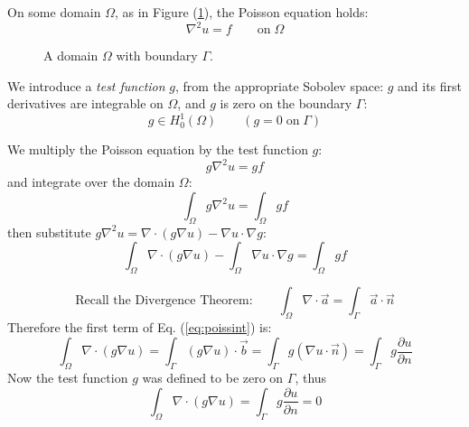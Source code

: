 \documentclass[12pt, a4paper, twoside, openright]{book}
\begin{document}
\vspace{2em}

On some domain $\Omega$, as in Figure (\ref{domain}), the Poisson equation holds:
\begin{equation}
\nabla^2 u = f \qquad \text{on} \; \Omega
\end{equation}

\vspace{1em}
\begin{figure}[ht]
\centering
{}
\caption{A domain $\Omega$ with boundary $\Gamma$.}\label{domain}
\end{figure}

We introduce a \emph{test function} $g$, from the appropriate Sobolev space:  $g$ and its first derivatives are integrable on $\Omega$, and $g$ is zero on the boundary $\Gamma$:
\begin{equation}
g \in H_0^1(\Omega) \qquad (g=0 \; \text{on} \; \Gamma)
\end{equation}

We multiply the Poisson equation by the test function $g$:
\begin{equation}
g \nabla^2 u = g f
\end{equation}
and integrate over the domain $\Omega$:
\begin{equation}
\int_{\Omega} g \nabla^2 u = \int_{\Omega} g f
\end{equation}
then substitute $g \nabla^2 u = \nabla \cdot (g \nabla u) - \nabla u \cdot \nabla g$:
\begin{equation}
\int_{\Omega} \nabla \cdot (g \nabla u) - \int_{\Omega} \nabla u \cdot \nabla g  
= \int_{\Omega} g f
\label{eq:poissint}
\end{equation}

\begin{equation}
\text{Recall the Divergence Theorem:} \qquad
\int_{\Omega} \nabla \cdot \vec{a}  = \int_{\Gamma} \vec{a} \cdot \vec{n}
\end{equation}
Therefore the first term of Eq. (\ref{eq:poissint}) is:
\begin{equation}
\int_{\Omega} \nabla \cdot (g \nabla u) = 
\int_{\Gamma} (g \nabla u) \cdot \vec{b} = \int_{\Gamma} g (\nabla u \cdot \vec{n})
= \int_{\Gamma} g \frac{\partial u}{\partial n}
\end{equation}
Now the test function $g$ was defined to be zero on $\Gamma$, thus
\begin{equation}
\int_{\Omega} \nabla \cdot (g \nabla u)
 = \int_{\Gamma} g \frac{\partial u}{\partial n} =0
\end{equation}
\end{document}
